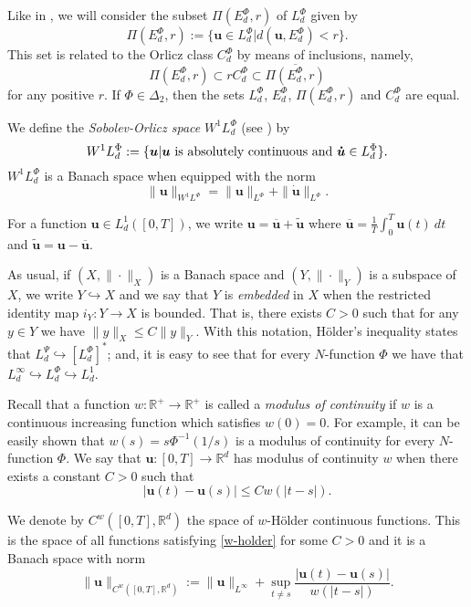 \documentclass[twoside]{article}
\theoremstyle{remark}
\newcommand{\orlnor}{\|_{L^{\Phi}}}
\newcommand{\lphi}{L^{\Phi}}
\newcommand{\lpsi}{L^{\Psi}}
\newcommand{\ephi}{E^{\Phi}}
\newcommand{\claseor}{C^{\Phi}}
\newcommand{\wphi}{W^{1}\lphi}
\renewcommand{\b}[1]{\boldsymbol{#1}}
\newcommand{\rr}{\mathbb{R}}
\renewcommand{\leq}{\leqslant}
\begin{document}
Like in \cite{KR}, we will consider the subset $\Pi(\ephi_d,r)$ of $\lphi_d$ given by
\[\Pi(\ephi_d,r):=\{\b{u}\in\lphi_d| d(\b{u},\ephi_d)<r\}.\]
This set is related to the Orlicz class $\claseor_d$ by means of inclusions, namely,
\begin{equation}\label{inclusiones}\Pi(\ephi_d, r )\subset r \claseor_d\subset\overline{\Pi(\ephi_d,r)}
\end{equation}
for any positive $r$.
If $\Phi \in \Delta_2$,  then the sets $\lphi_d$, $\ephi_d$, $\Pi(\ephi_d,r)$ and $\claseor_d$ are equal.



We define the \emph{Sobolev-Orlicz space} $\wphi_d$ (see \cite{adams_sobolev}) by
\[\wphi_d:=\{\b{u}| \b{u} \hbox{ is absolutely continuous and } \b{\dot{u}}\in \lphi_d\}.\]
$\wphi_d$ is a Banach space when equipped with the norm
\[
\|  \b{u}  \|_{\wphi}= \|  \b{u}  \|_{\lphi} + \|\b{\dot{u}}\orlnor.
\]



For a  function $\b{u}\in L^1_d([0,T])$, we write $\b{u}=\overline{\b{u}}+\widetilde{\b{u}}$ where $\overline{\b{u}} =\frac1T\int_0^T \b{u}(t)\ dt$ and $\widetilde{\b{u}}=\b{u}-\overline{\b{u}}$.

As usual, if $(X,\|\cdot\|_X)$ is a Banach space and $(Y,\|\cdot \|_Y)$ is a subspace of $X$,  we write $Y\hookrightarrow X$ and we say that $Y$ is \emph{embedded} in $X$  when the restricted identity map $i_Y:Y\to X$ is bounded. That is, there exists $C>0$ such that  for any $y\in Y$ we have $\|y\|_X\leq C\|y\|_Y$.  With this notation, H\"older's inequality states that  $\lpsi_d\hookrightarrow  \left[\lphi_d\right]^*$; and, it is easy to see that for every $N$-function $\Phi$ we have that $L^{\infty}_d\hookrightarrow\lphi_d \hookrightarrow L^1_d$.


 Recall that a function   $w:\mathbb{R}^+\to \mathbb{R}^+$ is called  a \emph{modulus of continuity} if $w$ is a continuous increasing function which satisfies $w(0)=0$. For example, it can be easily shown that $w(s)=s\Phi^{-1}(1/s)$ is a modulus of  continuity for every $N$-function $\Phi$.  We say that $\b{u}:[0,T]\to\rr^d$  has modulus of continuity $w$  when there exists a constant $C>0$ such that 
\begin{equation}\label{w-holder}|\b{u}(t)-\b{u}(s)|\leq Cw(|t-s|).
\end{equation}


We denote by $C^w([0,T],\rr^d)$  the space of  $w$-H\"older continuous functions. This is the space of all functions satisfying \eqref{w-holder} for some $C>0$ and it is a Banach space with norm
\[\|\b{u}\|_{  C^w([0,T],\rr^d) }  :=\|\b{u}\|_{L^{\infty}}+\sup\limits_{t\neq s}\frac{|\b{u}(t)-\b{u}(s)|}{w(|t-s|)}.\]
\end{document}
